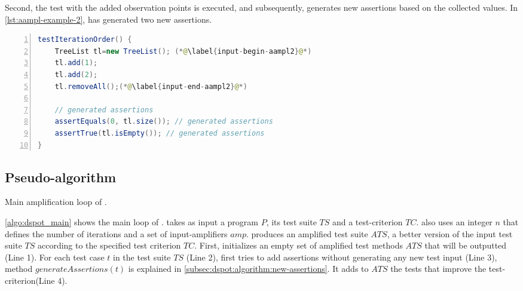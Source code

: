 Second, the test with the added observation points is executed, and subsequently, \dspot generates new assertions based on the collected values. 
In \autoref{lst:aampl-example-2}, \dspot has generated two new assertions.

\begin{lstlisting}[caption={In \Aampl{}, the last step is to generate the assertions based on the collected values.},label=lst:aampl-example-2,float,language=java,numbers=left] 
testIterationOrder() {
	TreeList tl=new TreeList(); (*@\label{input-begin-aampl2}@*)
	tl.add(1);
	tl.add(2);
	tl.removeAll();(*@\label{input-end-aampl2}@*)
	
	// generated assertions
	assertEquals(0, tl.size()); // generated assertions
	assertTrue(tl.isEmpty()); // generated assertions
}
\end{lstlisting}

\subsection{Pseudo-algorithm}
\label{subsec:dspot:algorithm:pseudo-algo}

\begin{algorithm}[t]
	\begin{algorithmic}[1]
		\EndFor
		\EndFor
		\EndFor
	\end{algorithmic}
	\caption{Main amplification loop of \dspot.}
	\label{algo:dspot_main}
\end{algorithm}

\autoref{algo:dspot_main} shows the main loop of \dspot. 
\dspot takes as input a program $P$, its test suite $TS$ and a test-criterion $TC$. 
\dspot also uses an integer $n$ that defines the number of iterations and a set of input-amplifiers $amp$.
\dspot produces an amplified test suite $ATS$, \ie a better version of the input test suite $TS$ according to the specified test criterion $TC$.
First, \dspot initializes an empty set of amplified test methods $ATS$ that will be outputted (Line 1).
For each test case $t$ in the test suite $TS$ (Line 2), 
\dspot first tries to add assertions without generating any new test input (Line 3), method $generateAssertions\left(t\right)$ is explained in \autoref{subsec:dspot:algorithm:new-assertions}.
It adds to $ATS$ the tests that improve the test-criterion(Line 4).

